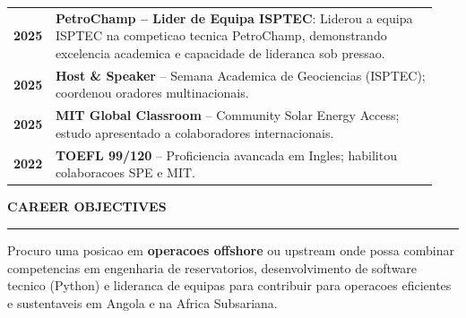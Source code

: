 \documentclass[10pt,a4paper]{article}
\renewcommand{\textbf}[1]{{\bfseries\color{cvgold}#1}}
\newcommand{\mainSection}[1]{%
  \vspace{1pt}%
  {\bfseries\color{cvgold}\large\MakeUppercase{#1}}%
  \par\vspace{0pt}%
  {\color{cvgold}\rule{\linewidth}{0.9pt}}%
  \par\vspace{1pt}%
}
\begin{document}
\begin{minipage}[t]{\dimexpr 0.705\paperwidth - 26pt}
  \renewcommand{\arraystretch}{1.40}
  \begin{tabular}{@{} p{0.06\linewidth} p{0.88\linewidth} @{}}
    {\bfseries\color{cvgold}2025} &
      \textbf{PetroChamp -- Lider de Equipa ISPTEC}: Liderou a equipa ISPTEC na competicao tecnica PetroChamp, demonstrando excelencia academica e capacidade de lideranca sob pressao.\\
    {\bfseries\color{cvgold}2025} &
      \textbf{Host \& Speaker} -- Semana Academica de Geociencias (ISPTEC); coordenou oradores multinacionais.\\
    {\bfseries\color{cvgold}2025} &
      \textbf{MIT Global Classroom} -- Community Solar Energy Access; estudo apresentado a colaboradores internacionais.\\
    {\bfseries\color{cvgold}2022} &
      \textbf{TOEFL 99/120} -- Proficiencia avancada em Ingles; habilitou colaboracoes SPE e MIT.\\
  \end{tabular}
  \renewcommand{\arraystretch}{1}

  \mainSection{Career Objectives}
  Procuro uma posicao em \textbf{operacoes offshore} ou upstream onde possa combinar
  competencias em engenharia de reservatorios, desenvolvimento de software tecnico
  (Python) e lideranca de equipas para contribuir para operacoes eficientes e
  sustentaveis em Angola e na Africa Subsariana.

  \vspace{2pt}

\end{minipage}
\end{document}
